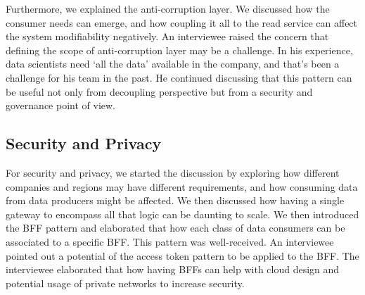 \documentclass[a4paper,11pt,article,oneside]{memoir}
\begin{document}
Furthermore, we explained the anti-corruption layer. We discussed how the consumer needs can emerge, and how coupling it all to the read service can affect the system modifiability negatively. An interviewee raised the concern that defining the scope of anti-corruption layer may be a challenge. In his experience, data scientists need `all the data' available in the company, and that's been a challenge for his team in the past. He continued discussing that this pattern can be useful not only from decoupling perspective but from a security and governance point of view.





\subsection{Security and Privacy}

For security and privacy, we started the discussion by exploring how different companies and regions may have different requirements, and how consuming data from data producers might be affected. We then discussed how having a single gateway to encompass all that logic can be daunting to scale. We then introduced the BFF pattern and elaborated that how each class of data consumers can be associated to a specific BFF. This pattern was well-received. An interviewee pointed out a potential of the access token pattern to be applied to the BFF. The interviewee elaborated that how having BFFs can help with cloud design and potential usage of private networks to increase security. 
\end{document}

